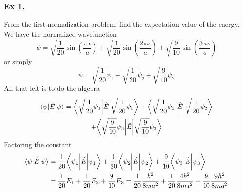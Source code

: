 \documentclass[../../../main.tex]{subfiles}
\begin{document}
\subsubsection*{Ex 1.} From the first normalization problem, find the expectation value of the energy. We have the normalized wavefunction
\begin{equation*}
    \psi=\sqrt{\frac{1}{20}}\sin\left(\frac{\pi x}{a}\right) + \sqrt{\frac{1}{20}}\sin\left(\frac{2 \pi x}{a}\right)  +  \sqrt{\frac{9}{10}}\sin\left(\frac{3\pi x}{a}\right) 
\end{equation*}
or simply
\begin{equation*}
    \psi=\sqrt{\frac{1}{20}}\psi_1 + \sqrt{\frac{1}{20}}\psi_2 +  \sqrt{\frac{9}{10}}\psi_2
\end{equation*}
All that left is to do the algebra
\begin{multline*}
    \braket{\psi|\hat{E}|\psi}=\bigg\langle \sqrt{\frac{1}{20}}\psi_1 \bigg| \hat{E}\bigg| \sqrt{\frac{1}{20}} \psi_1\bigg\rangle +
    \bigg\langle \sqrt{\frac{1}{20}}\psi_2 \bigg| \hat{E}\bigg| \sqrt{\frac{1}{20}} \psi_2\bigg\rangle \\
    +\bigg\langle \sqrt{\frac{9}{10}}\psi_3 \bigg| \hat{E}\bigg| \sqrt{\frac{9}{10}} \psi_3\bigg\rangle 
\end{multline*}
Factoring the constant
\begin{align*}
    \braket{\psi|\hat{E}|\psi}&=\frac{1}{20}\bigg\langle \psi_1 \bigg| \hat{E}\bigg|  \psi_1\bigg\rangle +
    \frac{1}{20}\bigg\langle \psi_2 \bigg| \hat{E}\bigg|  \psi_2\bigg\rangle
    +\frac{9}{10}\bigg\langle \psi_3 \bigg| \hat{E}\bigg|  \psi_3\bigg\rangle\\
    &=\frac{1}{20}E_1 + \frac{1}{20}E_2 +\frac{9}{10}E_3=\frac{1}{20}\frac{h^2}{8m a^2} + \frac{1}{20}\frac{4h^2}{8m a^2} +\frac{9}{10}\frac{9h^2}{8m a^2}
\end{align*}
\end{document}
